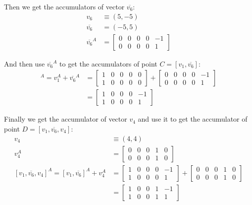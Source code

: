 \documentclass[11pt]{article}
\begin{document}
Then we get the accumulators of vector $\overline{v_6}$:
\begin{align}
v_6 &\equiv (5,-5)\nonumber\\
\overline{v_6} &= (-5,5)\nonumber\\
\overline{v_6}^A &= \left[\begin{array}{ccccc}0&0&0&0&-1 \\ 0&0&0&0&1 \end{array}\right]
\end{align}

And then use $\overline{v_6}^A$ to get the accumulators of point $C=[v_1,\overline{v_6}]$:
\begin{align}
[v_1, \overline{v_6}]^A = v_1^A + \overline{v_6}^A
 &= \left[\begin{array}{ccccc}1&0&0&0&0 \\ 1&0&0&0&0 \end{array}\right] +
 \left[\begin{array}{ccccc}0&0&0&0&-1 \\ 0&0&0&0&1 \end{array}\right]\nonumber\\
 &= \left[\begin{array}{ccccc}1&0&0&0&-1 \\ 1&0&0&0&1 \end{array}\right]
\end{align}

Finally we get the accumulator of vector $v_4$ and use it to get the accumulator of point $D = [v_1,\overline{v_6},v_4]$:
\begin{align}
v_4 &\equiv (4,4)\nonumber\\
v_4^A &= \left[\begin{array}{ccccc}0&0&0&1&0 \\ 0&0&0&1&0 \end{array}\right]\nonumber\\
[v_1, \overline{v_6}, v_4]^A = [v_1, \overline{v_6}]^A + v_4^A
 &= \left[\begin{array}{ccccc}1&0&0&0&-1 \\ 1&0&0&0&1 \end{array}\right]
 + \left[\begin{array}{ccccc}0&0&0&1&0 \\ 0&0&0&1&0 \end{array}\right]\nonumber\\
 &= \left[\begin{array}{ccccc}1&0&0&1&-1 \\ 1&0&0&1&1 \end{array}\right]
\end{align}
\end{document}
